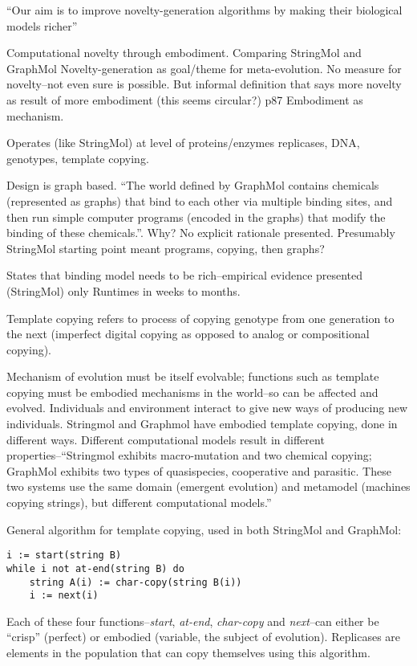 \begin{NOTES}
``Our aim is to improve novelty-generation algorithms by making their biological models richer''

Computational novelty through embodiment. Comparing StringMol and GraphMol
Novelty-generation as goal/theme for meta-evolution. No measure for novelty--not even sure is possible. But informal definition that says more novelty as result of more embodiment (this seems circular?) p87 Embodiment as mechanism. 

Operates (like StringMol) at level of proteins/enzymes \eg replicases, DNA, genotypes, template copying.

Design is graph based. ``The world defined by GraphMol contains chemicals (represented as graphs) that bind to each other via multiple binding sites, and then run simple computer programs (encoded in the graphs) that modify the binding of these chemicals.''. Why? No explicit rationale presented. Presumably StringMol starting point meant programs, copying, then graphs? 

States that binding model needs to be rich--empirical evidence presented (StringMol) only
Runtimes in weeks to months.

Template copying refers to process of copying genotype from one generation to the next (imperfect digital copying as opposed to analog or compositional copying).

Mechanism of evolution must be itself evolvable; functions such as template copying must be embodied mechanisms in the world--so can be affected and evolved.
Individuals and environment interact to give new ways of producing new individuals.
Stringmol and Graphmol have embodied template copying, done in different ways. Different computational models result in different properties--``Stringmol exhibits macro-mutation and two chemical copying; GraphMol exhibits two types of quasispecies, cooperative and parasitic. These two systems use the same domain (emergent evolution) and metamodel (machines copying strings), but different computational models.''

General algorithm for template copying, used in both StringMol and GraphMol: \cite{Nellis2014}
\begin{verbatim}
i := start(string B)
while i not at-end(string B) do
	string A(i) := char-copy(string B(i))
	i := next(i)
\end{verbatim}

Each of these four functions--\emph{start}, \emph{at-end}, \emph{char-copy} and \emph{next}--can either be ``crisp'' (\ie perfect) or embodied (variable, the subject of evolution). Replicases are elements in the population that can copy themselves using this algorithm.


\end{NOTES}
